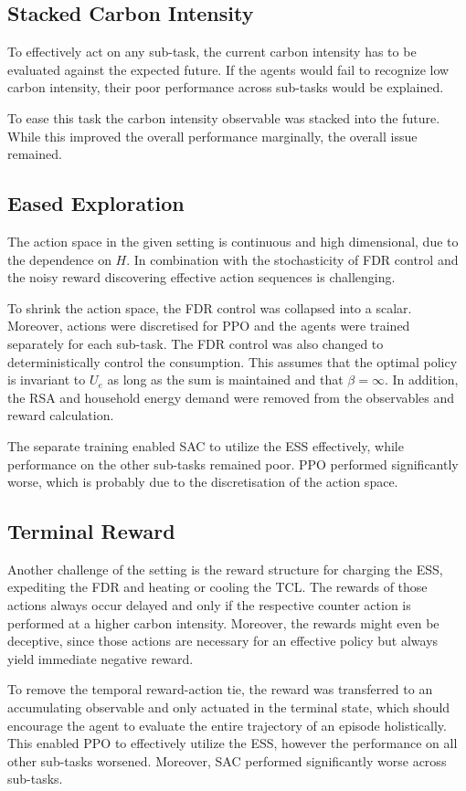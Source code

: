 \subsection{Stacked Carbon Intensity}
To effectively act on any sub-task, the current carbon intensity has to be evaluated against the expected future. If the agents would fail to recognize low carbon intensity, their poor performance across sub-tasks would be explained.
\par
To ease this task the carbon intensity observable was stacked into the future. While this improved the overall performance marginally, the overall issue remained.


\subsection{Eased Exploration}
The action space in the given setting is continuous and high dimensional, due to the dependence on $H$. In combination with the stochasticity of FDR control and the noisy reward discovering effective action sequences is challenging.
\par
To shrink the action space, the FDR control was collapsed into a scalar. Moreover, actions were discretised for PPO and the agents were trained separately for each sub-task. The FDR control was also changed to deterministically control the consumption. This assumes that the optimal policy is invariant to $U_e$ as long as the sum is maintained and that $\beta = \infty$. In addition, the RSA and household energy demand were removed from the observables and reward calculation.
\par
The separate training enabled SAC to utilize the ESS effectively, while performance on the other sub-tasks remained poor. PPO performed significantly worse, which is probably due to the discretisation of the action space.


\subsection{Terminal Reward}
Another challenge of the setting is the reward structure for charging the ESS, expediting the FDR and heating or cooling the TCL. The rewards of those actions always occur delayed and only if the respective counter action is performed at a higher carbon intensity. Moreover, the rewards might even be deceptive, since those actions are necessary for an effective policy but always yield immediate negative reward.
\par
To remove the temporal reward-action tie, the reward was transferred to an accumulating observable and only actuated in the terminal state, which should encourage the agent to evaluate the entire trajectory of an episode holistically. This enabled PPO to effectively utilize the ESS, however the performance on all other sub-tasks worsened. Moreover, SAC performed significantly worse across sub-tasks.